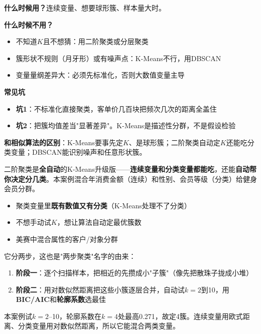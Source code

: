 \begin{algonotes}
\textbf{什么时候用？}连续变量、想要球形簇、样本量大时。

\textbf{什么时候不用？}
\begin{itemize}
    \item 不知道$K$且不想猜：用二阶聚类或分层聚类
    \item 簇形状不规则（月牙形）或有噪声点：K-Means不行，用DBSCAN
    \item 变量量纲差异大：必须先标准化，否则大数值变量主导
\end{itemize}

\textbf{常见坑}
\begin{itemize}
    \item \textbf{坑1}：不标准化直接聚类，客单价几百块把频次几次的距离全盖住
    \item \textbf{坑2}：把簇均值差当"显著差异"。K-Means是描述性分群，不是假设检验
\end{itemize}

\textbf{和相似算法的区别}：K-Means要事先定$K$、是球形簇；二阶聚类自动定$K$还能吃分类变量；DBSCAN能识别噪声和任意形状簇。
\end{algonotes}


\begin{algointro}
二阶聚类是\textbf{全自动}的K-Means升级版——\textbf{连续变量和分类变量都能吃}，还能\textbf{自动帮你决定分几类}。本案例混合年消费金额（连续）和性别、会员等级（分类）给健身会员分群。
\end{algointro}

\begin{algoscene}
\begin{itemize}
    \item 聚类变量里\textbf{既有数值又有分类}（K-Means处理不了分类）
    \item 不想手动试$K$，想让算法自动定最优簇数
    \item 美赛中混合属性的客户/对象分群
\end{itemize}
\end{algoscene}

\begin{algoprinciple}
它分两步，这也是"两步聚类"名字的由来：
\begin{enumerate}
    \item \textbf{阶段一}：逐个扫描样本，把相近的先攒成小"子簇"（像先把散珠子拢成小堆）
    \item \textbf{阶段二}：用对数似然距离把这些小簇逐层合并，自动试$k=2$到10，用\textbf{BIC/AIC}和\textbf{轮廓系数}选最佳
\end{enumerate}

本案例试$k=2$--10，轮廓系数在$k=4$处最高0.271，故定4簇。连续变量用欧式距离、分类变量用对数似然距离，所以它能混合两类变量。
\end{algoprinciple}

